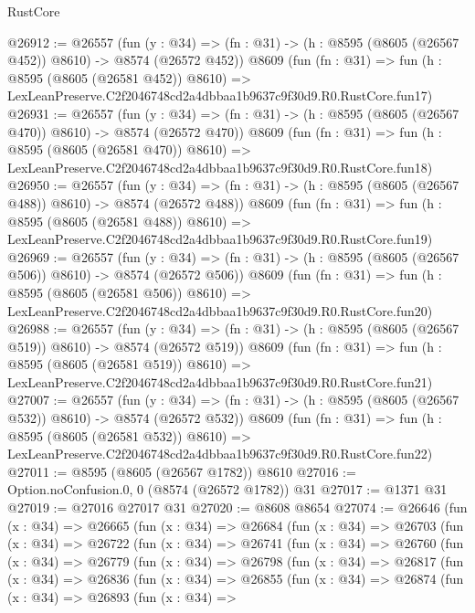 \begin{lexlean}{RustCore}
\begin{coremodule}
@26912 := @26557
    (fun (y : @34) => (fn : @31) -> (h : @8595 (@8605 (@26567 @452)) @8610) -> @8574 (@26572 @452))
    @8609
    (fun (fn : @31) =>
    fun (h : @8595 (@8605 (@26581 @452)) @8610) =>
    LexLeanPreserve.C2f2046748cd2a4dbbaa1b9637c9f30d9.R0.RustCore.fun17)
@26931 := @26557
    (fun (y : @34) => (fn : @31) -> (h : @8595 (@8605 (@26567 @470)) @8610) -> @8574 (@26572 @470))
    @8609
    (fun (fn : @31) =>
    fun (h : @8595 (@8605 (@26581 @470)) @8610) =>
    LexLeanPreserve.C2f2046748cd2a4dbbaa1b9637c9f30d9.R0.RustCore.fun18)
@26950 := @26557
    (fun (y : @34) => (fn : @31) -> (h : @8595 (@8605 (@26567 @488)) @8610) -> @8574 (@26572 @488))
    @8609
    (fun (fn : @31) =>
    fun (h : @8595 (@8605 (@26581 @488)) @8610) =>
    LexLeanPreserve.C2f2046748cd2a4dbbaa1b9637c9f30d9.R0.RustCore.fun19)
@26969 := @26557
    (fun (y : @34) => (fn : @31) -> (h : @8595 (@8605 (@26567 @506)) @8610) -> @8574 (@26572 @506))
    @8609
    (fun (fn : @31) =>
    fun (h : @8595 (@8605 (@26581 @506)) @8610) =>
    LexLeanPreserve.C2f2046748cd2a4dbbaa1b9637c9f30d9.R0.RustCore.fun20)
@26988 := @26557
    (fun (y : @34) => (fn : @31) -> (h : @8595 (@8605 (@26567 @519)) @8610) -> @8574 (@26572 @519))
    @8609
    (fun (fn : @31) =>
    fun (h : @8595 (@8605 (@26581 @519)) @8610) =>
    LexLeanPreserve.C2f2046748cd2a4dbbaa1b9637c9f30d9.R0.RustCore.fun21)
@27007 := @26557
    (fun (y : @34) => (fn : @31) -> (h : @8595 (@8605 (@26567 @532)) @8610) -> @8574 (@26572 @532))
    @8609
    (fun (fn : @31) =>
    fun (h : @8595 (@8605 (@26581 @532)) @8610) =>
    LexLeanPreserve.C2f2046748cd2a4dbbaa1b9637c9f30d9.R0.RustCore.fun22)
@27011 := @8595 (@8605 (@26567 @1782)) @8610
@27016 := Option.noConfusion.{0, 0} (@8574 (@26572 @1782)) @31
@27017 := @1371 @31
@27019 := @27016 @27017 @31
@27020 := @8608 @8654
@27074 := @26646
    (fun (x : @34) =>
    @26665
      (fun (x : @34) =>
      @26684
        (fun (x : @34) =>
        @26703
          (fun (x : @34) =>
          @26722
            (fun (x : @34) =>
            @26741
              (fun (x : @34) =>
              @26760
                (fun (x : @34) =>
                @26779
                  (fun (x : @34) =>
                  @26798
                    (fun (x : @34) =>
                    @26817
                      (fun (x : @34) =>
                      @26836
                        (fun (x : @34) =>
                        @26855
                          (fun (x : @34) =>
                          @26874
                            (fun (x : @34) =>
                            @26893
                              (fun (x : @34) =>

\end{coremodule}
\end{lexlean}
